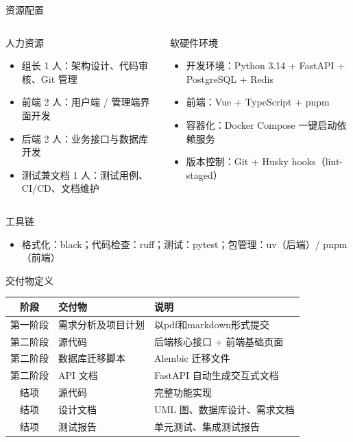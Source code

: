 \documentclass[aspectratio=169,UTF8]{ctexbeamer}
\begin{document}
\begin{frame}{资源配置}
    \begin{columns}
        \begin{block}{人力资源}
            \begin{itemize}
                \item 组长 1 人：架构设计、代码审核、Git 管理
                \item 前端 2 人：用户端 / 管理端界面开发
                \item 后端 2 人：业务接口与数据库开发
                \item 测试兼文档 1 人：测试用例、CI/CD、文档维护
            \end{itemize}
        \end{block}
        \begin{block}{软硬件环境}
            \begin{itemize}
                \item 开发环境：Python 3.14 + FastAPI + PostgreSQL + Redis
                \item 前端：Vue + TypeScript + pnpm
                \item 容器化：Docker Compose 一键启动依赖服务
                \item 版本控制：Git + Husky hooks（lint-staged）
            \end{itemize}
        \end{block}
    \end{columns}
    \vspace{0.3cm}
    \begin{block}{工具链}
        \begin{itemize}
            \item 格式化：black；代码检查：ruff；测试：pytest；包管理：uv（后端）/ pnpm（前端）
        \end{itemize}
    \end{block}
\end{frame}

\begin{frame}{交付物定义}
    \small
    \centering
    \begin{tabular}{clp{6cm}}
        \toprule
        \textbf{阶段} & \textbf{交付物} & \textbf{说明} \\
        \midrule
        第一阶段 & 需求分析及项目计划 & 以pdf和markdown形式提交 \\
        \midrule
        第二阶段 & 源代码 & 后端核心接口 + 前端基础页面 \\
        第二阶段 & 数据库迁移脚本 & Alembic 迁移文件 \\
        第二阶段 & API 文档& FastAPI 自动生成交互式文档 \\
        \midrule
        结项 & 源代码 & 完整功能实现 \\
        结项 & 设计文档 & UML 图、数据库设计、需求文档 \\
        结项 & 测试报告 & 单元测试、集成测试报告 \\
        \bottomrule
    \end{tabular}
\end{frame}
\end{document}
